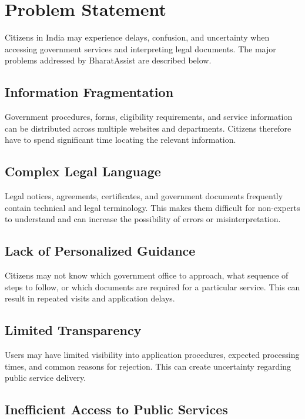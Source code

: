 \documentclass[12pt,a4paper]{report}
\begin{document}
\chapter{Problem Statement}

Citizens in India may experience delays, confusion, and uncertainty when accessing government services and interpreting legal documents. The major problems addressed by BharatAssist are described below.

\section{Information Fragmentation}

Government procedures, forms, eligibility requirements, and service information can be distributed across multiple websites and departments. Citizens therefore have to spend significant time locating the relevant information.

\section{Complex Legal Language}

Legal notices, agreements, certificates, and government documents frequently contain technical and legal terminology. This makes them difficult for non-experts to understand and can increase the possibility of errors or misinterpretation.

\section{Lack of Personalized Guidance}

Citizens may not know which government office to approach, what sequence of steps to follow, or which documents are required for a particular service. This can result in repeated visits and application delays.

\section{Limited Transparency}

Users may have limited visibility into application procedures, expected processing times, and common reasons for rejection. This can create uncertainty regarding public service delivery.

\section{Inefficient Access to Public Services}
\end{document}

